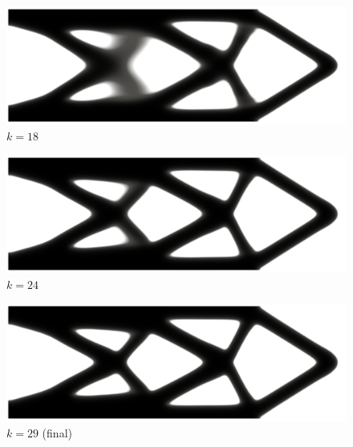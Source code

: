 \documentclass[aspectratio=169,xcolor=dvipsnames,11pt]{beamer}
\begin{document}
\begin{frame}
\begin{figure}
\begin{minipage}[c]{0.96\textwidth}
		\begin{minipage}[c]{0.32\textwidth}
		\small
			\centering
			\includegraphics[width=\textwidth]{Figures/TopOpt/alpha25/Cantilever18.png}
			\\[3pt]
			$k = 18$
		\end{minipage}
		\begin{minipage}[c]{0.32\textwidth}
		\small
			\centering
			\includegraphics[width=\textwidth]{Figures/TopOpt/alpha25/Cantilever24.png}
			\\[3pt]
			$k = 24$
		\end{minipage}
		\begin{minipage}[c]{0.32\textwidth}
		\small
			\centering
			\includegraphics[width=\textwidth]{Figures/TopOpt/alpha25/Cantilever29.png}
			\\[3pt]
			$k = 29$ (final)
		\end{minipage}
	\end{minipage}
	\begin{minipage}[c]{0.032\textwidth}
		\centering

\end{minipage}
\end{figure}
\end{frame}
\end{document}
